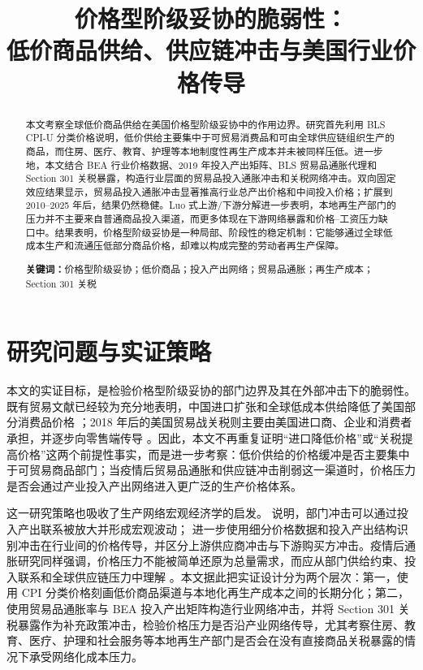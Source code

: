 \documentclass[12pt,a4paper,fontset=none]{ctexart}
\title{\heiti 价格型阶级妥协的脆弱性：\\低价商品供给、供应链冲击与美国行业价格传导}
\author{}
\date{}
\begin{document}
\maketitle

\begin{abstract}
本文考察全球低价商品供给在美国价格型阶级妥协中的作用边界。研究首先利用 BLS CPI-U 分类价格说明，低价供给主要集中于可贸易消费品和可由全球供应链组织生产的商品，而住房、医疗、教育、护理等本地制度性再生产成本并未被同样压低。进一步地，本文结合 BEA 行业价格数据、2019 年投入产出矩阵、BLS 贸易品通胀代理和 Section 301 关税暴露，构造行业层面的贸易品投入通胀冲击和关税网络冲击。双向固定效应结果显示，贸易品投入通胀冲击显著推高行业总产出价格和中间投入价格；扩展到 2010--2025 年后，结果仍然稳健。Luo 式上游/下游分解进一步表明，本地再生产部门的压力并不主要来自普通商品投入渠道，而更多体现在下游网络暴露和价格--工资压力缺口中。结果表明，价格型阶级妥协是一种局部、阶段性的稳定机制：它能够通过全球低成本生产和流通压低部分商品价格，却难以构成完整的劳动者再生产保障。

\noindent\textbf{关键词：}价格型阶级妥协；低价商品；投入产出网络；贸易品通胀；再生产成本；Section 301 关税
\end{abstract}

\section{研究问题与实证策略}

本文的实证目标，是检验价格型阶级妥协的部门边界及其在外部冲击下的脆弱性。既有贸易文献已经较为充分地表明，中国进口扩张和全球低成本供给降低了美国部分消费品价格 \citep{jaravel2019trade}；2018 年后的美国贸易战关税则主要由美国进口商、企业和消费者承担，并逐步向零售端传导 \citep{amiti2020tariffs,cavallo2021tariff}。因此，本文不再重复证明“进口降低价格”或“关税提高价格”这两个前提性事实，而是进一步考察：低价供给的价格缓冲是否主要集中于可贸易商品部门；当疫情后贸易品通胀和供应链冲击削弱这一渠道时，价格压力是否会通过产业投入产出网络进入更广泛的生产价格体系。

这一研究策略也吸收了生产网络宏观经济学的启发。\citet{acemoglu2012network} 说明，部门冲击可以通过投入产出联系被放大并形成宏观波动；\citet{luo2023propagation} 进一步使用细分价格数据和投入产出结构识别冲击在行业间的价格传导，并区分上游供应商冲击与下游购买方冲击。疫情后通胀研究同样强调，价格压力不能被简单还原为总量需求，而应从部门供给约束、投入联系和全球供应链压力中理解 \citep{baqaee2022supply,digiovanni2022gscpi,pasten2020monetary}。本文据此把实证设计分为两个层次：第一，使用 CPI 分类价格刻画低价商品渠道与本地化再生产成本之间的长期分化；第二，使用贸易品通胀率与 BEA 投入产出矩阵构造行业网络冲击，并将 Section 301 关税暴露作为补充政策冲击，检验价格压力是否沿产业网络传导，尤其考察住房、教育、医疗、护理和社会服务等本地再生产部门是否会在没有直接商品关税暴露的情况下承受网络化成本压力。
\end{document}
